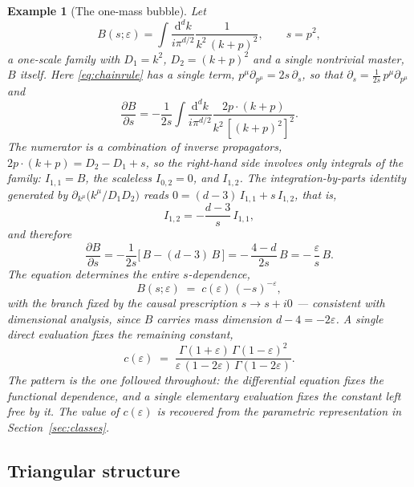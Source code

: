 \documentclass[11pt]{article}
\newcommand{\eps}{\varepsilon}
\newcommand{\dd}{\mathrm{d}}
\newtheorem{example}[definition]{Example}
\begin{document}
\begin{example}[The one-mass bubble]
\label{ex:bubble}
Let
\begin{equation}
  B(s;\eps) = \int \frac{\dd^d k}{i\pi^{d/2}}
  \frac{1}{k^2\,(k+p)^2}, \qquad s = p^2 ,
\end{equation}
a one-scale family with $D_1 = k^2$, $D_2 = (k+p)^2$ and a single
nontrivial master, $B$ itself.  Here \eqref{eq:chainrule} has a
single term, $p^\mu\partial_{p^\mu} = 2s\,\partial_s$, so that
$\partial_s = \frac{1}{2s}\, p^\mu \partial_{p^\mu}$ and
\begin{equation}
  \frac{\partial B}{\partial s}
  = -\frac{1}{2s}\int \frac{\dd^d k}{i\pi^{d/2}}
    \frac{2p\cdot(k+p)}{k^2\,[(k+p)^2]^2} .
\end{equation}
The numerator is a combination of inverse propagators,
$2 p\cdot(k+p) = D_2 - D_1 + s$, so the right-hand side involves
only integrals of the family: $I_{1,1} = B$, the scaleless
$I_{0,2} = 0$, and $I_{1,2}$.  The integration-by-parts identity
generated by $\partial_{k^\mu}\!\big(k^\mu/D_1 D_2\big)$ reads
$0 = (d-3)\,I_{1,1} + s\,I_{1,2}$, that is,
\begin{equation}
  I_{1,2} = -\frac{d-3}{s}\, I_{1,1},
\end{equation}
and therefore
\begin{equation}
  \frac{\partial B}{\partial s}
  = -\frac{1}{2s}\Big[\,B - (d-3)\,B\,\Big]
  = -\,\frac{4-d}{2s}\,B
  = -\,\frac{\eps}{s}\, B .
  \label{eq:bubblede}
\end{equation}
The equation determines the entire $s$-dependence,
\begin{equation}
  B(s;\eps) \;=\; c(\eps)\,(-s)^{-\eps},
\end{equation}
with the branch fixed by the causal prescription $s \to s + i0$ ---
consistent with dimensional analysis, since $B$ carries mass
dimension $d - 4 = -2\eps$.  A single direct evaluation fixes the
remaining constant,
\begin{equation}
  c(\eps) \;=\;
  \frac{\Gamma(1+\eps)\,\Gamma(1-\eps)^2}
       {\eps\,(1-2\eps)\,\Gamma(1-2\eps)} .
\end{equation}
The pattern is the one followed throughout: the differential equation
fixes the functional dependence, and a single elementary evaluation
fixes the constant left free by it.  The value of $c(\eps)$ is
recovered from the parametric representation in
Section~\ref{sec:classes}.
\end{example}

\subsection{Triangular structure}
\end{document}
